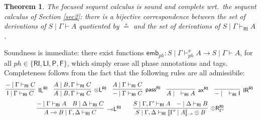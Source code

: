 \documentclass[submission,copyright,creativecommons]{eptcs}
\newtheorem{theorem}{Theorem}[section]
\newtheorem{lemma}[theorem]{Lemma}
\theoremstyle{definition}
\newcommand{\ldbc}{[\![}
\newcommand{\rdbc}{]\!]}
\newcommand{\tl}{\otimes \mathsf{L}}
\newcommand{\tr}{\otimes \mathsf{R}}
\newcommand{\lleft}{{\multimap}\mathsf{L}}
\newcommand{\pass}{\mathsf{pass}}
\newcommand{\unitl}{\mathsf{IL}}
\newcommand{\unitr}{\mathsf{IR}}
\newcommand{\ax}{\mathsf{ax}}
\newcommand{\ot}{\otimes}
\newcommand{\lolli}{\multimap}
\newcommand{\I}{\mathsf{I}}
\newcommand{\RI}{\mathsf{RI}}
\newcommand{\LI}{\mathsf{LI}}
\newcommand{\Pass}{\mathsf{P}}
\newcommand{\F}{\mathsf{F}}
\newcommand{\NMILL}{\texttt{NMILL}}
\newcommand{\SkNMILL}{\NMILL\textsuperscript{\textit{s}}}
\begin{document}
 \begin{theorem}
   The focused sequent calculus is sound and complete wrt.\ the  sequent calculus of Section \ref{sec2}: there is a bijective correspondence between the set of derivations of $S \mid \Gamma \vdash A$ quotiented by $\circeq$ and the set of derivations of $S \mid \Gamma \vdash_\RI A$.
 \end{theorem}
Soundness is immediate: there exist functions $\mathsf{emb}_{ph} : S \mid \Gamma \vdash^x_{ph} A \to S \mid \Gamma \vdash A$, for all $ph \in \{\RI,\LI,\Pass, \F \}$, which simply erase all phase annotations and tags. Completeness follows from the fact that the following rules are all admissibile: %
\vspace{-.1cm}
\begin{equation}\label{eq:admis}
  \begin{array}{c}
    \hspace{-3.9pt}
    \infer[\unitl^{\RI}]{\I \mid \Gamma \vdash_{\RI} C}{- \mid \Gamma \vdash_{\RI} C}
    \quad
    \infer[\tl^{\RI}]{A \mid B, \Gamma \vdash_{\RI} C}{A \mid B, \Gamma \vdash_{\RI} C}
    \quad
    \infer[\pass^{\RI}]{- \mid \Gamma \vdash_{\RI} C}{A \mid \Gamma \vdash_{\RI} C}
    \quad
    \infer[\ax^{\RI}]{A \mid \quad \vdash_{\RI} A}{}
    \quad
    \infer[\unitr^{\RI}]{- \mid \quad \vdash_{\RI} \I}{}
\\[6pt]
    \infer[\lleft^{\RI}]{A \lolli B \mid \Gamma , \Delta \vdash_{\RI} C}{
    - \mid \Gamma \vdash_{\RI} A
    &
    B \mid \Delta \vdash_{\RI} C
    }
    \qquad
    \infer[\tr_{\Gamma'}^{\RI}]{S \mid \Gamma , \Delta \vdash_{\RI} \ldbc \Gamma' \mid A \rdbc_{\lolli} \ot B}{
      S \mid \Gamma , \Gamma' \vdash_{\RI} A
      &
      - \mid \Delta \vdash_{\RI} B
    }
  \end{array}
\end{equation}
\end{document}
